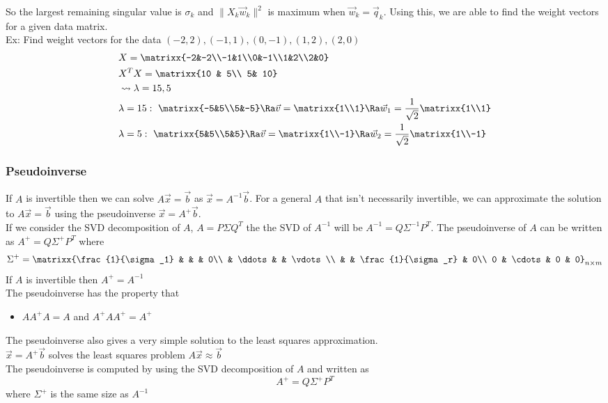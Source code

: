 So the largest remaining singular value is $\sigma_k$ and $\|X_k\vec{w}_k\|^2$ is maximum when $\vec{w}_k=\vec{q}_k$. Using this, we are able to find the weight vectors for a given data matrix.\\
Ex: Find weight vectors for the data $(-2,2),(-1,1),(0,-1),(1,2),(2,0)$
\begin{align*}
    &X=\matrixx{-2&-2\\-1&1\\0&-1\\1&2\\2&0}\\
    &X^TX=\matrixx{10 & 5\\ 5& 10}\\
    &\leadsto \lambda=15,5\\
    &\lambda=15:\ \matrixx{-5&5\\5&-5}\Ra \vec{v}=\matrixx{1\\1}\Ra \vec{w}_1=\frac{1}{\sqrt{2}}\matrixx{1\\1}\\
    &\lambda=5:\ \matrixx{5&5\\5&5}\Ra \vec{v}=\matrixx{1\\-1}\Ra \vec{w}_2=\frac{1}{\sqrt{2}}\matrixx{1\\-1}
\end{align*}

\subsubsection{Pseudoinverse}
If $A$ is invertible then we can solve $A\vec{x}=\vec{b}$ as $\vec{x}=A^{-1}\vec{b}$. For a general $A$ that isn't necessarily invertible, we can approximate the solution to $A\vec{x}=\vec{b}$ using the pseudoinverse $\vec{x}=A^+\vec{b}$.\\
If we consider the SVD decomposition of $A$, $A=P\Sigma Q^T$ the the SVD of $A^{-1}$ will be $A^{-1}=Q\Sigma^{-1}P^T$. The pseudoinverse of $A$ can be written as $A^+=Q\Sigma^+P^T$ where
$$\Sigma^+=\matrixx{\frac{1}{\sigma_1} & & & 0\\ & \ddots & & \vdots\\ & & \frac{1}{\sigma_r} & 0\\ 0 & \cdots & 0 & 0}_{n\times m}$$
If $A$ is invertible then $A^+=A^{-1}$\\
The pseudoinverse has the property that
\begin{itemize}
    \item $AA^+A=A$ and $A^+AA^+=A^+$
\end{itemize}
The pseudoinverse also gives a very simple solution to the least squares approximation.\\
$\vec{x}=A^+\vec{b}$ solves the least squares problem $A\vec{x}\approx\vec{b}$\\
The pseudoinverse is computed by using the SVD decomposition of $A$ and written as
$$A^+=Q\Sigma^+ P^T$$
where $\Sigma^+$ is the same size as $A^{-1}$

